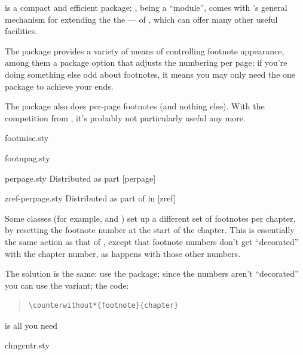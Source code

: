  is a compact and efficient package;
, being a  ``module'', comes with
's general mechanism for extending the the
--- of \latex{}, which can offer many other
useful facilities.

The  package provides a variety of means of
controlling footnote appearance, among them a package option
 that adjusts the numbering per page; if you're
doing something else odd about footnotes, it means you may only need
the one package to achieve your ends.

The  package also does per-page footnotes (and
nothing else).  With the competition from , it's
probably not particularly useful any more.
\begin{ctanrefs}
\item[footmisc.sty]
\item[footnpag.sty]
\item[perpage.sty]Distributed as part [perpage]
\item[zref-perpage.sty]Distributed as part of  in
  [zref]
\end{ctanrefs}


Some classes (for example,  and ) set up a
different set of footnotes per chapter, by resetting the footnote
number at the start of the chapter.  This is essentially the same
action as that of %
,
except that footnote numbers don't get ``decorated'' with the chapter
number, as happens with those other numbers.

The solution is the same: use the  package; since the
numbers aren't ``decorated'' you can use the 
variant; the code:
\begin{quote}
\begin{verbatim}
\counterwithout*{footnote}{chapter}
\end{verbatim}
\end{quote}
is all you need
\begin{ctanrefs}
\item[chngcntr.sty]
\end{ctanrefs}

